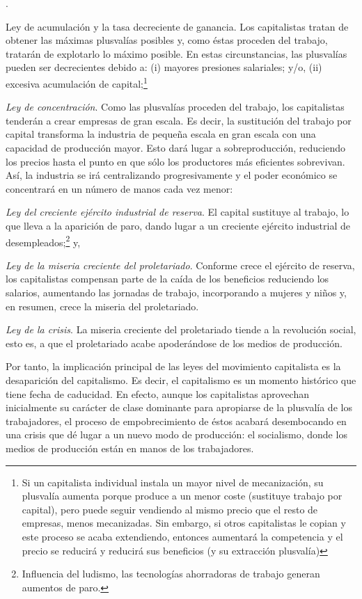 \documentclass[10pt,a4paper]{article}
\newcounter{numitem}
\newenvironment{lnum}
      {\begin{list}{\arabic{numitem}.}{%
          \usecounter{numitem}%
          \setlength{\leftmargin}{1cm}%
          \setlength{\parskip}{3pt}%
          \setlength{\itemsep}{0pt}%
          \setlength{\parsep}{0pt}%
      }}
      {\end{list}}
\begin{document}
\begin{lnum}
    \item Ley de acumulación y la tasa decreciente de ganancia. Los capitalistas tratan de obtener las máximas plusvalías posibles y, como éstas proceden del trabajo, tratarán de explotarlo lo máximo posible. En estas circunstancias, las plusvalías pueden ser decrecientes debido a: (i) mayores presiones salariales; y/o, (ii) excesiva acumulación de capital;\footnote{%
        Si un capitalista individual instala un mayor nivel de mecanización, su plusvalía aumenta porque produce a un menor coste (sustituye trabajo por capital), pero puede seguir vendiendo al mismo precio que el resto de empresas, menos mecanizadas. Sin embargo, si otros capitalistas le copian y este proceso se acaba extendiendo, entonces aumentará la competencia y el precio se reducirá y reducirá sus beneficios (y su extracción plusvalía)
    }
    \item \textit{Ley de concentración}. Como las plusvalías proceden del trabajo, los capitalistas tenderán a crear empresas de gran escala. Es decir, la sustitución del trabajo por capital transforma la industria de pequeña escala en gran escala con una capacidad de producción mayor. Esto dará lugar a sobreproducción, reduciendo los precios hasta el punto en que sólo los productores más eficientes sobrevivan. Así, la industria se irá centralizando progresivamente y el poder económico se concentrará en un número de manos cada vez menor:
    \item \textit{Ley del creciente ejército industrial de reserva}. El capital sustituye al trabajo, lo que lleva a la aparición de paro, dando lugar a un creciente ejército industrial de desempleados;\footnote{%
        Influencia del ludismo, las tecnologías ahorradoras de trabajo generan aumentos de paro.
    } y,
    \item \textit{Ley de la miseria creciente del proletariado}. Conforme crece el ejército de reserva, los capitalistas compensan parte de la caída de los beneficios reduciendo los salarios, aumentando las jornadas de trabajo, incorporando a mujeres y niños y, en resumen, crece la miseria del proletariado.
    \item \textit{Ley de la crisis}. La miseria creciente del proletariado tiende a la revolución social, esto es, a que el proletariado acabe apoderándose de los medios de producción.
\end{lnum}

Por tanto, la implicación principal de las leyes del movimiento capitalista es la desaparición del capitalismo. Es decir, el capitalismo es un momento histórico que tiene fecha de caducidad. En efecto, aunque los capitalistas aprovechan inicialmente su carácter de clase dominante para apropiarse de la plusvalía de los trabajadores, el proceso de empobrecimiento de éstos acabará desembocando en una crisis que dé lugar a un nuevo modo de producción: el socialismo, donde los medios de producción están en manos de los trabajadores.
\end{document}
